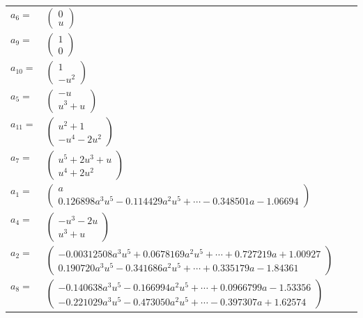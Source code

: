 \documentclass[1p]{elsarticle_modified}
\theoremstyle{definition}
\begin{document}
\begin{tabular}{m{7pt} m{180pt} m{7pt} m{180pt} }
\flushright $a_{6}=$&$\begin{pmatrix}0\\u\end{pmatrix}$ \\
\flushright $a_{9}=$&$\begin{pmatrix}1\\0\end{pmatrix}$ \\
\flushright $a_{10}=$&$\begin{pmatrix}1\\- u^2\end{pmatrix}$ \\
\flushright $a_{5}=$&$\begin{pmatrix}- u\\u^3+u\end{pmatrix}$ \\
\flushright $a_{11}=$&$\begin{pmatrix}u^2+1\\- u^4-2 u^2\end{pmatrix}$ \\
\flushright $a_{7}=$&$\begin{pmatrix}u^5+2 u^3+u\\u^4+2 u^2\end{pmatrix}$ \\
\flushright $a_{1}=$&$\begin{pmatrix}a\\0.126898 a^{3} u^{5}-0.114429 a^{2} u^{5}+\cdots-0.348501 a-1.06694\end{pmatrix}$ \\
\flushright $a_{4}=$&$\begin{pmatrix}- u^3-2 u\\u^3+u\end{pmatrix}$ \\
\flushright $a_{2}=$&$\begin{pmatrix}-0.00312508 a^{3} u^{5}+0.0678169 a^{2} u^{5}+\cdots+0.727219 a+1.00927\\0.190720 a^{3} u^{5}-0.341686 a^{2} u^{5}+\cdots+0.335179 a-1.84361\end{pmatrix}$ \\
\flushright $a_{8}=$&$\begin{pmatrix}-0.140638 a^{3} u^{5}-0.166994 a^{2} u^{5}+\cdots+0.0966799 a-1.53356\\-0.221029 a^{3} u^{5}-0.473050 a^{2} u^{5}+\cdots-0.397307 a+1.62574\end{pmatrix}$ \\

\end{tabular}
\end{document}
